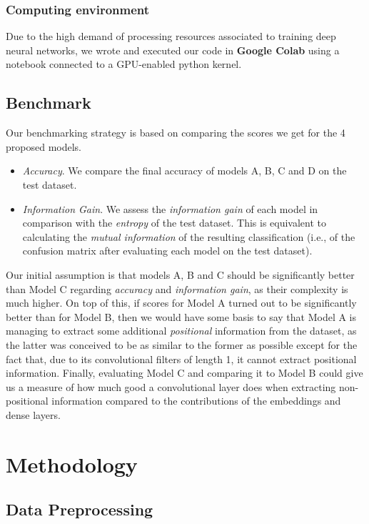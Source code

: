 \documentclass[10pt,journal,compsoc, onecolumn]{IEEEtran}
\begin{document}
\subsubsection{Computing environment}
Due to the high demand of processing resources associated to training deep neural networks, we wrote and executed our code in \textbf{Google Colab} using a notebook connected to a GPU-enabled python kernel. 


\subsection{Benchmark}
Our benchmarking strategy is based on comparing the scores we get for the 4 proposed models.

\begin{itemize}
    \item \textit{Accuracy}. We compare the final accuracy of models A, B, C and D on the test dataset. 
    \item \textit{Information Gain}. We assess the \textit{information gain} of each model in comparison with the \emph{entropy} of the test dataset. This is equivalent to calculating the \textit{mutual information} of the resulting classification (i.e., of the confusion matrix after evaluating each model on the test dataset).
\end{itemize}

Our initial assumption is that models A, B and C should be significantly better than Model C regarding \textit{accuracy} and \textit{information gain}, as their complexity is much higher. On top of this, if scores for Model A turned out to be significantly better than for Model B, then we would have some basis to say that Model A is managing to extract some additional \emph{positional} information from the dataset, as the latter was conceived to be as similar to the former as possible except for the fact that, due to its convolutional filters of length 1,  it cannot extract positional information. Finally, evaluating Model C and comparing it to Model B could give us a measure of how much good a convolutional layer does when extracting non-positional information compared to the contributions of the embeddings and dense layers.

\section{Methodology}
\subsection{Data Preprocessing}
\end{document}
